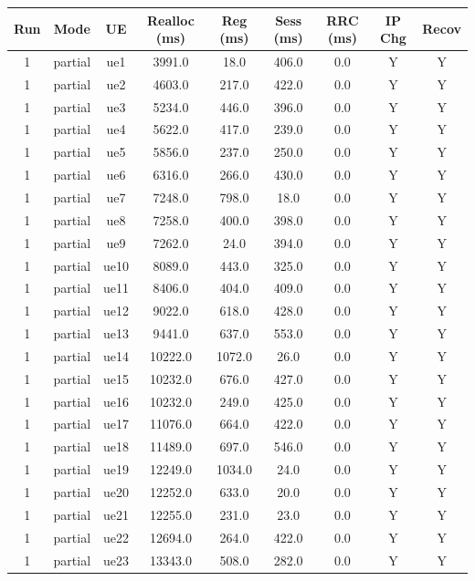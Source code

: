 \begin{table}[ht]
\centering
\begin{tabular}{|c|c|c|c|c|c|c|c|c|}
\hline
Run & Mode & UE & Realloc (ms) & Reg (ms) & Sess (ms) & RRC (ms) & IP Chg & Recov \\
\hline
1 & partial & ue1 & 3991.0 & 18.0 & 406.0 & 0.0 & Y & Y \\
1 & partial & ue2 & 4603.0 & 217.0 & 422.0 & 0.0 & Y & Y \\
1 & partial & ue3 & 5234.0 & 446.0 & 396.0 & 0.0 & Y & Y \\
1 & partial & ue4 & 5622.0 & 417.0 & 239.0 & 0.0 & Y & Y \\
1 & partial & ue5 & 5856.0 & 237.0 & 250.0 & 0.0 & Y & Y \\
1 & partial & ue6 & 6316.0 & 266.0 & 430.0 & 0.0 & Y & Y \\
1 & partial & ue7 & 7248.0 & 798.0 & 18.0 & 0.0 & Y & Y \\
1 & partial & ue8 & 7258.0 & 400.0 & 398.0 & 0.0 & Y & Y \\
1 & partial & ue9 & 7262.0 & 24.0 & 394.0 & 0.0 & Y & Y \\
1 & partial & ue10 & 8089.0 & 443.0 & 325.0 & 0.0 & Y & Y \\
1 & partial & ue11 & 8406.0 & 404.0 & 409.0 & 0.0 & Y & Y \\
1 & partial & ue12 & 9022.0 & 618.0 & 428.0 & 0.0 & Y & Y \\
1 & partial & ue13 & 9441.0 & 637.0 & 553.0 & 0.0 & Y & Y \\
1 & partial & ue14 & 10222.0 & 1072.0 & 26.0 & 0.0 & Y & Y \\
1 & partial & ue15 & 10232.0 & 676.0 & 427.0 & 0.0 & Y & Y \\
1 & partial & ue16 & 10232.0 & 249.0 & 425.0 & 0.0 & Y & Y \\
1 & partial & ue17 & 11076.0 & 664.0 & 422.0 & 0.0 & Y & Y \\
1 & partial & ue18 & 11489.0 & 697.0 & 546.0 & 0.0 & Y & Y \\
1 & partial & ue19 & 12249.0 & 1034.0 & 24.0 & 0.0 & Y & Y \\
1 & partial & ue20 & 12252.0 & 633.0 & 20.0 & 0.0 & Y & Y \\
1 & partial & ue21 & 12255.0 & 231.0 & 23.0 & 0.0 & Y & Y \\
1 & partial & ue22 & 12694.0 & 264.0 & 422.0 & 0.0 & Y & Y \\
1 & partial & ue23 & 13343.0 & 508.0 & 282.0 & 0.0 & Y & Y \\

\end{tabular}
\end{table}
